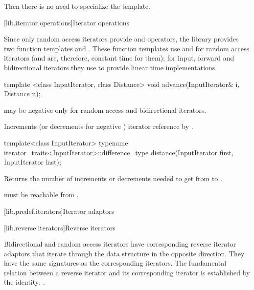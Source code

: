 \pnum
Then there is no need to specialize the
template.
\exitexampleb

[lib.iterator.operations]{Iterator operations}

\pnum
Since only random access iterators provide
\tcode{+}
and
\tcode{-}
operators, the library provides two
function templates
and
.
These
function templates
use
\tcode{+}
and
\tcode{-}
for random access iterators (and are, therefore, constant
time for them); for input, forward and bidirectional iterators they use
\tcode{++}
to provide linear time
implementations.

%
\begin{itemdecl}
template <class InputIterator, class Distance>
  void advance(InputIterator& i, Distance n);
\end{itemdecl}

\begin{itemdescr}
\pnum
\requires
{}
may be negative only for random access and bidirectional iterators.

\pnum
\effects
Increments (or decrements for negative
)
iterator reference
by
.
\end{itemdescr}

%
\begin{itemdecl}
    template<class InputIterator>
        typename iterator_traits<InputIterator>::difference_type
           distance(InputIterator first, InputIterator last);
\end{itemdecl}

\begin{itemdescr}
\pnum
\effects
Returns the number of increments or decrements needed to get from
to
.

\pnum
\requires
{}
must be reachable from
.
\end{itemdescr}

[lib.predef.iterators]{Iterator adaptors}

[lib.reverse.iterators]{Reverse iterators}

\pnum
Bidirectional and random access iterators have corresponding reverse iterator
adaptors that iterate through the data structure in the opposite direction.
They have the same signatures as the corresponding iterators.
The fundamental relation between a reverse iterator and its corresponding iterator
is established by the identity:
.

